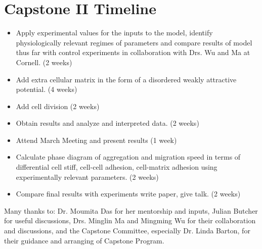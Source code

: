\documentclass[aps,prb,twocolumn,groupedaddress,nofootinbib,floatfix]{revtex4}
\begin{document}
\section*{Capstone II Timeline}
\begin{itemize}\itemsep1pt \parskip0pt
\item Apply experimental values for the inputs to the model, identify physiologically relevant regimes of parameters
and compare results of model thus far with control experiments in collaboration with Drs. Wu and Ma at Cornell. (2 weeks) 
\item Add extra cellular matrix in the form of a disordered weakly attractive potential. (4 weeks) 
\item Add cell division (2 weeks)
\item Obtain results and analyze and interpreted  data. (2 weeks)
\item Attend March Meeting and present results (1 week)
\item Calculate phase diagram of aggregation and migration speed in terms of differential 
cell stiff, cell-cell adhesion, cell-matrix adhesion using experimentally relevant parameters. (2 weeks)
 \item Compare final results with experiments  write paper, give talk. (2 weeks)
\end{itemize}

\begin{acknowledgments}
Many thanks to: Dr. Moumita Das for her mentorship and inputs, Julian Butcher for useful discussions, Drs. Minglin Ma and Mingming Wu for their collaboration and discussions, 
and the Capstone Committee, especially Dr. Linda Barton, for their guidance and arranging of Capstone Program.
\end{acknowledgments}

\vspace{0.6in}
%
%



\end{document}
